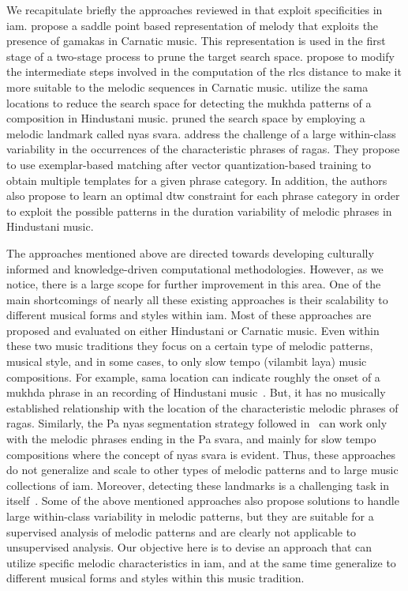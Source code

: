 We recapitulate briefly the approaches reviewed in  that exploit specificities in \gls{iam}. \cite{Ishwar2013} propose a saddle point based representation of melody that exploits the presence of \glspl{gamaka} in Carnatic music. This representation is used in the first stage of a two-stage process to prune the target search space. \cite{dutta2014modified} propose to modify the intermediate steps involved in the computation of the \gls{rlcs} distance to make it more suitable to the melodic sequences in Carnatic music. \cite{Ross2012b} utilize the \gls{sama} locations to reduce the search space for detecting the \gls{mukhda} patterns of a composition in Hindustani music. \cite{Ross2012} pruned the search space by employing a melodic landmark called \gls{nyas} \gls{svara}. \cite{Rao2014} address the challenge of a large within-class variability in the occurrences of the characteristic phrases of \glspl{raga}. They propose to use exemplar-based matching after vector quantization-based training to obtain multiple templates for a given phrase category. In addition, the authors also propose to learn an optimal \gls{dtw} constraint for each phrase category in order to exploit the possible patterns in the duration variability of melodic phrases in Hindustani music. 

The approaches mentioned above are directed towards developing culturally informed and knowledge-driven computational methodologies. However, as we notice, there is a large scope for further improvement in this area. One of the main shortcomings of nearly all these existing approaches is their scalability to different musical forms and styles within \gls{iam}. Most of these approaches are proposed and evaluated on either Hindustani or Carnatic music. Even within these two music traditions they focus on a certain type of melodic patterns, musical style, and in some cases, to only slow tempo (vilambit \gls{laya}) music compositions. For example, \gls{sama} location can indicate roughly the onset of a \gls{mukhda} phrase in an recording of Hindustani music~\citep{Ross2012b}. But, it has no musically established relationship with the location of the characteristic melodic phrases of \glspl{raga}. Similarly, the Pa \gls{nyas} segmentation strategy followed in~\cite{Ross2012} can work only with the melodic phrases ending in the Pa \gls{svara}, and mainly for slow tempo compositions where the concept of \gls{nyas} \gls{svara} is evident. Thus, these approaches do not generalize and scale to other types of melodic patterns and to large music collections of \gls{iam}. Moreover, detecting these landmarks is a challenging task in itself~\citep{srinivasamurthy2014supervised,gulati2014Landmark}. Some of the above mentioned approaches also propose solutions to handle large within-class variability in melodic patterns, but they are suitable for a supervised analysis of melodic patterns and are clearly not applicable to unsupervised analysis. Our objective here is to devise an approach that can utilize specific melodic characteristics in \gls{iam}, and at the same time generalize to different musical forms and styles within this music tradition.

